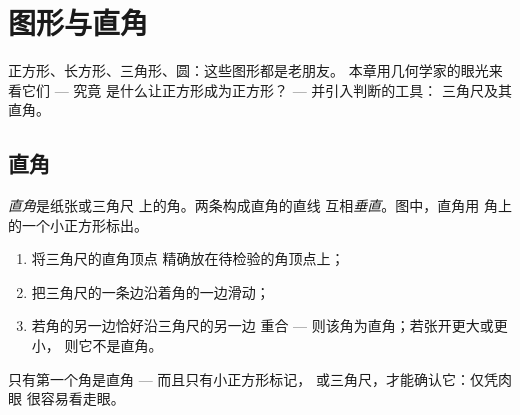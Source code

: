 \chapter{图形与直角}\label{ch:g3:shapes}

正方形、长方形、三角形、圆：这些图形都是老朋友。
本章用几何学家的眼光来看它们 --- 究竟
是什么让正方形成为正方形？ --- 并引入判断的工具：
三角尺及其直角。

\section{直角}

\begin{definition}[直角]\label{def:g3:shapes:rightangle}
\emph{直角}是纸张或三角尺
上的角。两条构成直角的直线
互相\emph{垂直}。图中，直角用
角上的一个小正方形标出。
\end{definition}

\begin{method}[检验直角]\label{met:g3:shapes:check}
\begin{enumerate}
  \item 将三角尺的直角顶点
        精确放在待检验的角顶点上；
  \item 把三角尺的一条边沿着角的一边滑动；
  \item 若角的另一边恰好沿三角尺的另一边
        重合 --- 则该角为直角；若张开更大或更小，
        则它不是直角。
\end{enumerate}
\end{method}

\begin{omfigure}

{\small 只有第一个角是直角 --- 而且只有小正方形标记，
或三角尺，才能确认它：仅凭肉眼
很容易看走眼。}
\end{omfigure}

